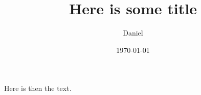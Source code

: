 \documentclass{article}
\title{Here is some title}
\date{\today}
\author{Daniel}
\begin{document}
\maketitle

    Here is then the text.
\end{document}
